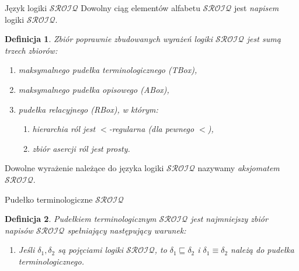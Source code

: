 \documentclass{beamer}
\newtheorem{definicja}{Definicja}
\begin{document}
\begin{frame}{Język logiki $\mathcal{SROIQ}$}
%
Dowolny ciąg elementów alfabetu $\mathcal{SROIQ}$ jest \emph{napisem} logiki $\mathcal{SROIQ}$.
%
\begin{definicja}
\label{PZWSROIQ}
Zbiór poprawnie zbudowanych wyrażeń logiki $\mathcal{SROIQ}$ jest sumą trzech zbiorów:
\begin{enumerate}
	\item maksymalnego pudełka terminologicznego (TBox),
	\item maksymalnego pudełka opisowego (ABox),
	\item pudełka relacyjnego (RBox), w którym:
	\begin{enumerate}
		\item hierarchia ról jest $<$-regularna (dla pewnego $<$),
		\item zbiór asercji ról jest prosty.
	\end{enumerate}
\end{enumerate}
\end{definicja}
%
Dowolne wyrażenie należące do języka logiki  $\mathcal{SROIQ}$ nazywamy \emph{aksjomatem} $\mathcal{SROIQ}$.
\end{frame}


\begin{frame}[shrink=0.9]{Pudełko terminologiczne $\mathcal{SROIQ}$}
%
\begin{definicja}
\label{TBoxSROIQ}
Pudełkiem terminologicznym $\mathcal{SROIQ}$ jest najmniejszy zbiór napisów $\mathcal{SROIQ}$ spełniający następujący warunek:
%
\begin{enumerate}
\item \label{item:TBox1}  Jeśli $\delta_{1}, \delta_{2}$ są pojęciami logiki $\mathcal{SROIQ}$, to $\delta_{1} \sqsubseteq \delta_{2}$ i $\delta_{1} \equiv \delta_{2}$ należą do pudełka terminologicznego.
\end{enumerate}
\end{definicja}
\end{frame}
\end{document}
